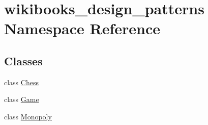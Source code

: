 \hypertarget{namespacewikibooks__design__patterns}{}\section{wikibooks\+\_\+design\+\_\+patterns Namespace Reference}
\label{namespacewikibooks__design__patterns}
\subsection*{Classes}
\begin{DoxyCompactItemize}
\item 
class \hyperlink{classwikibooks__design__patterns_1_1Chess}{Chess}
\item 
class \hyperlink{classwikibooks__design__patterns_1_1Game}{Game}
\item 
class \hyperlink{classwikibooks__design__patterns_1_1Monopoly}{Monopoly}
\end{DoxyCompactItemize}
